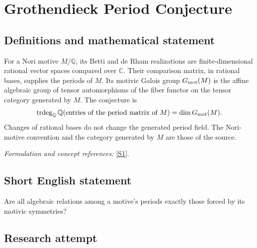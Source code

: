 \documentclass[11pt,a4paper]{article}
\newcommand{\Q}{\mathbb{Q}}
\newcommand{\C}{\mathbb{C}}
\newcommand{\sref}[2]{\hyperlink{source:#1:#2}{[S#2]}}
\newif\ifshowcatalogue
\newcommand{\cataloguescope}[1]{\ifshowcatalogue
 \paragraph{Exact scope in the supplied catalogue.}
 \begin{quote}\small #1\end{quote}\fi}
\numberwithin{equation}{section}
\begin{document}
\setcounter{section}{0}
\clearpage
\section*{\texorpdfstring{Grothendieck Period Conjecture}{Grothendieck Period Conjecture}}\label{30006975}
\subsection{Definitions and mathematical statement}
For a Nori motive $M/\Q$, its Betti and de Rham realizations are finite-dimensional rational vector spaces compared over $\C$. Their comparison matrix, in rational bases, supplies the periods of $M$. Its motivic Galois group $G_{\rm mot}(M)$ is the affine algebraic group of tensor automorphisms of the fiber functor on the tensor category generated by $M$. The conjecture is
\[
 \operatorname{trdeg}_{\Q}\Q(\text{entries of the period matrix of }M)
 =\dim G_{\rm mot}(M).
\]
Changes of rational bases do not change the generated period field. The Nori-motive convention and the category generated by $M$ are those of the source.
\par\smallskip\textit{Formulation and concept references:} \sref{30006975}{1}.
\cataloguescope{Prove that for every Nori motive M over Q, trdeg\_Q Q(periods of M) equals dim G\_mot(M), the dimension of its motivic Galois group.}
\subsection{Short English statement}
Are all algebraic relations among a motive's periods exactly those forced by its motivic symmetries?
\subsection{Research attempt}
\end{document}
